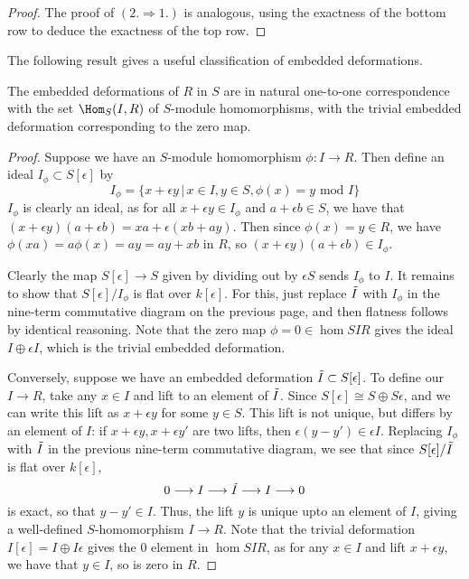 \begin{lemma}
\begin{proof}
        The proof of \((2.\Rightarrow 1.)\) is analogous, using the exactness of
        the bottom row to deduce the exactness of the top row.
    \end{proof}
\end{lemma}

The following result gives a useful classification of embedded deformations.

\begin{theorem} \label{embdef} 
    The embedded deformations of $R$ in $S$ are in natural one-to-one correspondence
    with the set $\Hom_S(I,R)$ of \(S\)-module homomorphisms, with the trivial
    embedded deformation corresponding to the zero map.  
    \begin{proof} 
        Suppose we have an $S$-module homomorphism $\phi:I\to R$. Then define an
        ideal $I_\phi\subset S[\epsilon]$ by 
        \[I_\phi=\bigg\{x+\epsilon y\,\bigg|\,x\in I,y\in S,\phi(x)=y\text{ mod
        }I\bigg\}\] 
        $I_\phi$ is clearly an ideal, as for all $x+\epsilon y\in
        I_\phi$ and $a+\epsilon b\in S$, we have that $( x+\epsilon
        y)(a+\epsilon b)=xa+\epsilon(xb+ay)$. Then since $\phi(x)=y\in R$, we
        have $\phi(xa)=a\phi(x)=ay=ay+xb$ in $R$, so $( x+\epsilon y)(a+\epsilon
        b)\in I_\phi$.  

        Clearly the map $S[\epsilon]\to S$ given by dividing out by $\epsilon S$
        sends $I_\phi$ to $I$. It remains to show that $S[\epsilon]/I_\phi$ is
        flat over $k[\epsilon]$. For this, just replace $\tilde{I}$ with $I_\phi$ in
        the nine-term commutative diagram on the previous page, and then
        flatness follows by identical reasoning. Note that the zero map
        $\phi=0\in\hom{S}{I}{R}$ gives the ideal $I\oplus\epsilon I$, which is
        the trivial embedded deformation.  

        Conversely, suppose we have an embedded deformation $\tilde{I}\subset
        S[\epsilon]$. To define our $I\to R$, take any $x\in I$ and lift to an
        element of $\tilde{I}$. Since $S[\epsilon]\cong S\oplus S\epsilon$, and we
        can write this lift as $x+\epsilon y$ for some $y\in S$. This lift is
        not unique, but differs by an element of $I$: if $x+\epsilon
        y,x+\epsilon y'$ are two lifts, then $\epsilon (y-y')\in \epsilon I$.
        Replacing $I_\phi$ with $\tilde{I}$ in the previous nine-term commutative
        diagram, we see that since $S[\epsilon]/\tilde{I}$ is flat over
        $k[\epsilon]$, 
        \[0\longrightarrow I\longrightarrow \tilde{I}\longrightarrow I\longrightarrow0\] 
        is exact, so that $y-y'\in I$. Thus, the lift $y$ is unique upto an
        element of $I$, giving a well-defined $S$-homomorphism $I\to R$. Note
        that the trivial deformation $I[\epsilon]=I\oplus I\epsilon$ gives the 0
        element in $\hom{S}{I}{R}$, as for any $x\in I$ and lift $x+\epsilon y$,
        we have that $y\in I$, so is zero in $R$.  


\end{proof}
\end{theorem}
